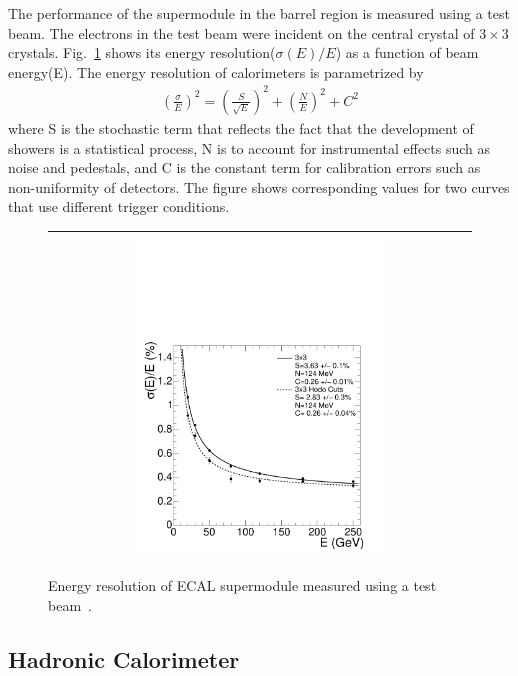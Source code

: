 The performance of the supermodule in the barrel region is measured 
using a test beam. The electrons in the test beam were incident on 
the central crystal of $3\times 3$ crystals.
Fig.~\ref{fig:ecal_res} shows its energy resolution($\sigma(E)/E$)
as a function of beam energy(E). The energy resolution of calorimeters is 
parametrized by 
\begin{eqnarray}
\left( \frac{\sigma}{E} \right)^2 
= 
\left( \frac{S}{\sqrt{E}}  \right)^2 + \left( \frac{N}{E} \right)^2 + C^2
\end{eqnarray} 
where S is the stochastic term that reflects the fact that the development of showers is    
a statistical process, N is to account for instrumental effects such as noise and pedestals, 
and C is the constant term for calibration errors such as non-uniformity of detectors.  
The figure shows corresponding values for two curves that use different trigger 
conditions. 

%
\begin{figure}[h] 
\vspace{1cm}
\centering 
\begin{tabular}{|c|} 
\hline
\includegraphics[width=0.6\textwidth]{figures/Figure_001-007.pdf}\\
\hline
\end{tabular} 
\caption{Energy resolution of ECAL supermodule measured using a test beam~\cite{cmstdr1}.}
\label{fig:ecal_res} 
\end{figure} 


\subsection{Hadronic Calorimeter} 

